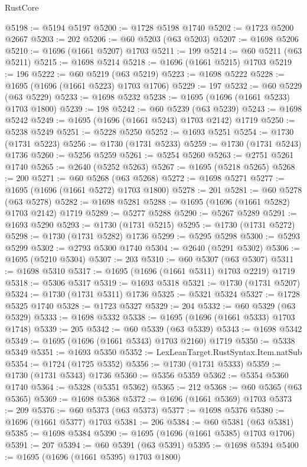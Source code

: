\begin{lexlean}{RustCore}
\begin{coremodule}
@5198 := @5194 @5197
@5200 := @1728 @5198 @1740
@5202 := @1723 @5200 @2667
@5203 := 202
@5206 := @60 @5203 (@63 @5203)
@5207 := @1698 @5206
@5210 := @1696 (@1661 @5207) @1703
@5211 := 199
@5214 := @60 @5211 (@63 @5211)
@5215 := @1698 @5214
@5218 := @1696 (@1661 @5215) @1703
@5219 := 196
@5222 := @60 @5219 (@63 @5219)
@5223 := @1698 @5222
@5228 := @1695 (@1696 (@1661 @5223) @1703 @1706)
@5229 := 197
@5232 := @60 @5229 (@63 @5229)
@5233 := @1698 @5232
@5238 := @1695 (@1696 (@1661 @5233) @1703 @1800)
@5239 := 198
@5242 := @60 @5239 (@63 @5239)
@5243 := @1698 @5242
@5249 := @1695 (@1696 (@1661 @5243) @1703 @2142) @1719
@5250 := @5238 @5249
@5251 := @5228 @5250
@5252 := @1693 @5251
@5254 := @1730 (@1731 @5223)
@5256 := @1730 (@1731 @5233)
@5259 := @1730 (@1731 @5243) @1736
@5260 := @5256 @5259
@5261 := @5254 @5260
@5263 := @2751 @5261 @1740
@5265 := @2640 (@5252 @5263)
@5267 := @1695 (@5218 @5265)
@5268 := 200
@5271 := @60 @5268 (@63 @5268)
@5272 := @1698 @5271
@5277 := @1695 (@1696 (@1661 @5272) @1703 @1800)
@5278 := 201
@5281 := @60 @5278 (@63 @5278)
@5282 := @1698 @5281
@5288 := @1695 (@1696 (@1661 @5282) @1703 @2142) @1719
@5289 := @5277 @5288
@5290 := @5267 @5289
@5291 := @1693 @5290
@5293 := @1730 (@1731 @5215)
@5295 := @1730 (@1731 @5272)
@5298 := @1730 (@1731 @5282) @1736
@5299 := @5295 @5298
@5300 := @5293 @5299
@5302 := @2793 @5300 @1740
@5304 := @2640 (@5291 @5302)
@5306 := @1695 (@5210 @5304)
@5307 := 203
@5310 := @60 @5307 (@63 @5307)
@5311 := @1698 @5310
@5317 := @1695 (@1696 (@1661 @5311) @1703 @2219) @1719
@5318 := @5306 @5317
@5319 := @1693 @5318
@5321 := @1730 (@1731 @5207)
@5324 := @1730 (@1731 @5311) @1736
@5325 := @5321 @5324
@5327 := @1728 @5325 @1740
@5328 := @1723 @5327
@5329 := 204
@5332 := @60 @5329 (@63 @5329)
@5333 := @1698 @5332
@5338 := @1695 (@1696 (@1661 @5333) @1703 @1748)
@5339 := 205
@5342 := @60 @5339 (@63 @5339)
@5343 := @1698 @5342
@5349 := @1695 (@1696 (@1661 @5343) @1703 @2160) @1719
@5350 := @5338 @5349
@5351 := @1693 @5350
@5352 := LexLeanTarget.RustSyntax.Item.natSub
@5354 := @1724 (@1725 @5352)
@5356 := @1730 (@1731 @5333)
@5359 := @1730 (@1731 @5343) @1736
@5360 := @5356 @5359
@5362 := @5354 @5360 @1740
@5364 := @5328 (@5351 @5362)
@5365 := 212
@5368 := @60 @5365 (@63 @5365)
@5369 := @1698 @5368
@5372 := @1696 (@1661 @5369) @1703
@5373 := 209
@5376 := @60 @5373 (@63 @5373)
@5377 := @1698 @5376
@5380 := @1696 (@1661 @5377) @1703
@5381 := 206
@5384 := @60 @5381 (@63 @5381)
@5385 := @1698 @5384
@5390 := @1695 (@1696 (@1661 @5385) @1703 @1706)
@5391 := 207
@5394 := @60 @5391 (@63 @5391)
@5395 := @1698 @5394
@5400 := @1695 (@1696 (@1661 @5395) @1703 @1800)

\end{coremodule}
\end{lexlean}
